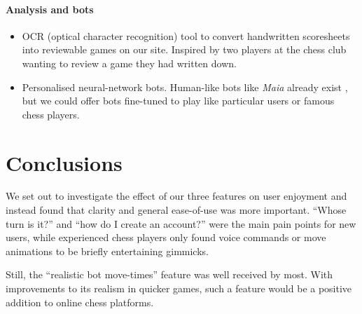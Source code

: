 \documentclass[12pt,titlepage,a4paper]{article}
\begin{document}
    \paragraph{Analysis and bots}
    \begin{itemize}[noitemsep]
        \item OCR (optical character recognition) tool to convert handwritten scoresheets into reviewable games on our site. Inspired by two players at the chess club wanting to review a game they had written down.
        \item Personalised neural-network bots. Human-like bots like \textit{Maia} already exist \citep{tang2024maia2unifiedmodelhumanai}, but we could offer bots fine-tuned to play like particular users or famous chess players.
    \end{itemize}


    \section{Conclusions}
    \label{Conclusions}

    We set out to investigate the effect of our three features on user enjoyment and instead found that clarity and general ease-of-use was more important. ``Whose turn is it?'' and ``how do I create an account?'' were the main pain points for new users, while experienced chess players only found voice commands or move animations to be briefly entertaining gimmicks.

    Still, the ``realistic bot move-times'' feature was well received by most. With improvements to its realism in quicker games, such a feature would be a positive addition to online chess platforms.


    \vskip 0.2in
    
    
\end{document}
